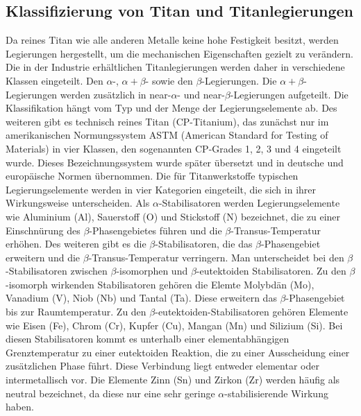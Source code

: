 \subsection{Klassifizierung von Titan und Titanlegierungen}

Da reines Titan wie alle anderen Metalle keine hohe Festigkeit besitzt, werden Legierungen hergestellt, um die mechanischen Eigenschaften gezielt zu verändern. Die in der Industrie erhältlichen Titanlegierungen werden daher in verschiedene Klassen eingeteilt. Den $\alpha$-, $\alpha+\beta$- sowie den $\beta$-Legierungen. Die $\alpha+\beta$-Legierungen werden zusätzlich in near-$\alpha$- und near-$\beta$-Legierungen aufgeteilt. Die Klassifikation hängt vom Typ und der Menge der Legierungselemente ab. Des weiteren gibt es technisch reines Titan (CP-Titanium), das zunächst nur im amerikanischen Normungssystem ASTM (American Standard for Testing of Materials) in vier Klassen, den sogenannten CP-Grades 1, 2, 3 und 4 eingeteilt wurde. Dieses Bezeichnungssystem wurde später übersetzt und in deutsche und europäische Normen übernommen.
Die für Titanwerkstoffe typischen Legierungselemente werden in vier Kategorien eingeteilt, die sich in ihrer Wirkungsweise unterscheiden. 
Als $\alpha$-Stabilisatoren werden Legierungselemente wie Aluminium (Al), Sauerstoff (O) und Stickstoff (N) bezeichnet, die zu einer Einschnürung des $\beta$-Phasengebietes führen und die $\beta$-Transus-Temperatur erhöhen.
Des weiteren gibt es die $\beta$-Stabilisatoren, die das $\beta$-Phasengebiet erweitern und die $\beta$-Transus-Temperatur verringern. Man unterscheidet bei den $\beta$-Stabilisatoren zwischen $\beta$-isomorphen und $\beta$-eutektoiden Stabilisatoren. Zu den $\beta$-isomorph wirkenden Stabilisatoren gehören die Elemte Molybdän (Mo), Vanadium (V), Niob (Nb) und Tantal (Ta). Diese erweitern das $\beta$-Phasengebiet bis zur Raumtemperatur. 
Zu den $\beta$-eutektoiden-Stabilisatoren gehören Elemente wie Eisen (Fe), Chrom (Cr), Kupfer (Cu), Mangan (Mn) und Silizium (Si). Bei diesen Stabilisatoren kommt es unterhalb einer elementabhängigen Grenztemperatur zu einer eutektoiden Reaktion, die zu einer Ausscheidung einer zusätzlichen Phase führt. Diese Verbindung liegt entweder elementar oder intermetallisch vor.
Die Elemente  Zinn (Sn) und Zirkon (Zr) werden häufig als neutral bezeichnet, da diese nur eine sehr geringe $\alpha$-stabilisierende Wirkung haben.

